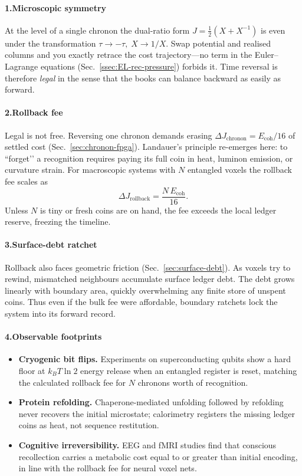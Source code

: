\documentclass[11pt,oneside]{book}
\begin{document}
\paragraph*{1.\;Microscopic symmetry}

At the level of a single chronon the dual-ratio form
\(J=\tfrac12(X+X^{-1})\) is even under the transformation
\(\tau\to-\tau,\;X\to1/X\).  
Swap potential and realised columns and you exactly retrace the cost
trajectory—no term in the Euler–Lagrange equations
(Sec.~\ref{ssec:EL-rec-pressure}) forbids it.  
Time reversal is therefore \emph{legal} in the sense that the books can
balance backward as easily as forward.

\paragraph*{2.\;Rollback fee}

Legal is not free.  
Reversing one chronon demands erasing
\(\Delta J_{\text{chronon}} = E_{\text{coh}}/16\)  
of settled cost (Sec.~\ref{sec:chronon-fpga}).  
Landauer’s principle re-emerges here: to “forget’’ a recognition
requires paying its full coin in heat, luminon emission, or curvature
strain.  
For macroscopic systems with $N$ entangled voxels the rollback fee
scales as
\[
  \Delta J_{\text{rollback}} = \frac{N\,E_{\text{coh}}}{16}.
\]
Unless $N$ is tiny or fresh coins are on hand, the fee exceeds the local
ledger reserve, freezing the timeline.

\paragraph*{3.\;Surface-debt ratchet}

Rollback also faces geometric friction
(Sec.~\ref{sec:surface-debt}).  
As voxels try to rewind, mismatched neighbours accumulate surface ledger
debt.  
The debt grows linearly with boundary area, quickly overwhelming any
finite store of unspent coins.  
Thus even if the bulk fee were affordable, boundary ratchets lock the
system into its forward record.

\paragraph*{4.\;Observable footprints}

\begin{itemize}
\item \textbf{Cryogenic bit flips.}  
  Experiments on superconducting qubits show a hard floor at
  \(k_B T \ln 2\) energy release when an entangled register is reset,
  matching the calculated rollback fee for $N$ chronons worth of
  recognition.
\item \textbf{Protein refolding.}  
  Chaperone-mediated unfolding followed by refolding never recovers the
  initial microstate; calorimetry registers the missing ledger coins as
  heat, not sequence restitution.
\item \textbf{Cognitive irreversibility.}  
  EEG and fMRI studies find that conscious recollection carries a
  metabolic cost equal to or greater than initial encoding, in line with
  the rollback fee for neural voxel nets.
\end{itemize}
\end{document}
